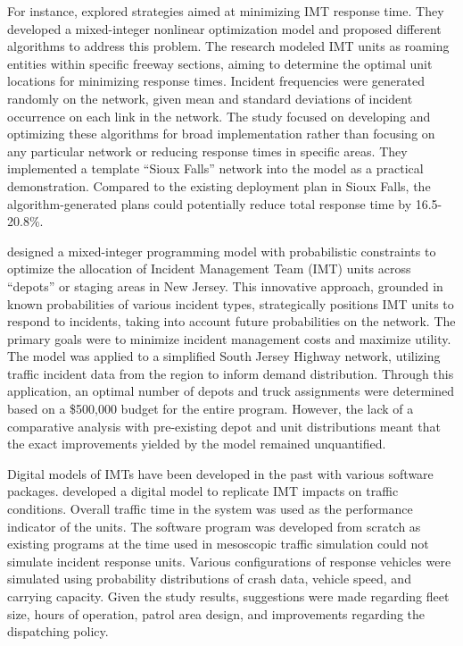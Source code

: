 \documentclass[
  letterpaper,
  authoryear]{elsarticle}
\begin{document}
For instance, \citet{lou2011} explored strategies aimed at minimizing
IMT response time. They developed a mixed-integer nonlinear optimization
model and proposed different algorithms to address this problem. The
research modeled IMT units as roaming entities within specific freeway
sections, aiming to determine the optimal unit locations for minimizing
response times. Incident frequencies were generated randomly on the
network, given mean and standard deviations of incident occurrence on
each link in the network. The study focused on developing and optimizing
these algorithms for broad implementation rather than focusing on any
particular network or reducing response times in specific areas. They
implemented a template ``Sioux Falls'' network into the model as a
practical demonstration. Compared to the existing deployment plan in
Sioux Falls, the algorithm-generated plans could potentially reduce
total response time by 16.5-20.8\%.

\citet{ozbay2013} designed a mixed-integer programming model with
probabilistic constraints to optimize the allocation of Incident
Management Team (IMT) units across ``depots'' or staging areas in New
Jersey. This innovative approach, grounded in known probabilities of
various incident types, strategically positions IMT units to respond to
incidents, taking into account future probabilities on the network. The
primary goals were to minimize incident management costs and maximize
utility. The model was applied to a simplified South Jersey Highway
network, utilizing traffic incident data from the region to inform
demand distribution. Through this application, an optimal number of
depots and truck assignments were determined based on a \$500,000 budget
for the entire program. However, the lack of a comparative analysis with
pre-existing depot and unit distributions meant that the exact
improvements yielded by the model remained unquantified.

Digital models of IMTs have been developed in the past with various
software packages. \citet{pal2002} developed a digital model to
replicate IMT impacts on traffic conditions. Overall traffic time in the
system was used as the performance indicator of the units. The software
program was developed from scratch as existing programs at the time used
in mesoscopic traffic simulation could not simulate incident response
units. Various configurations of response vehicles were simulated using
probability distributions of crash data, vehicle speed, and carrying
capacity. Given the study results, suggestions were made regarding fleet
size, hours of operation, patrol area design, and improvements regarding
the dispatching policy.
\end{document}
